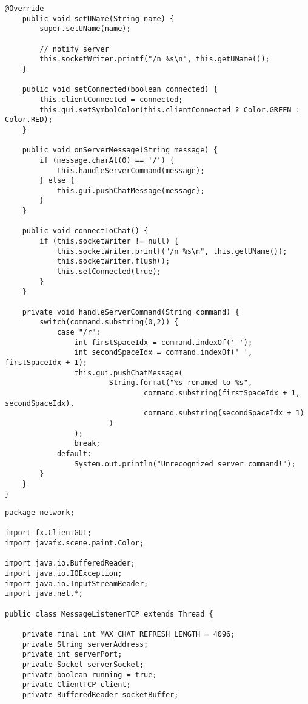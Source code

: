 \begin{enumerate}
\begin{lstlisting}[style=java]
    @Override
    public void setUName(String name) {
        super.setUName(name);

        // notify server
        this.socketWriter.printf("/n %s\n", this.getUName());
    }

    public void setConnected(boolean connected) {
        this.clientConnected = connected;
        this.gui.setSymbolColor(this.clientConnected ? Color.GREEN : Color.RED);
    }

    public void onServerMessage(String message) {
        if (message.charAt(0) == '/') {
            this.handleServerCommand(message);
        } else {
            this.gui.pushChatMessage(message);
        }
    }

    public void connectToChat() {
        if (this.socketWriter != null) {
            this.socketWriter.printf("/n %s\n", this.getUName());
            this.socketWriter.flush();
            this.setConnected(true);
        }
    }

    private void handleServerCommand(String command) {
        switch(command.substring(0,2)) {
            case "/r":
                int firstSpaceIdx = command.indexOf(' ');
                int secondSpaceIdx = command.indexOf(' ', firstSpaceIdx + 1);
                this.gui.pushChatMessage(
                        String.format("%s renamed to %s",
                                command.substring(firstSpaceIdx + 1, secondSpaceIdx),
                                command.substring(secondSpaceIdx + 1)
                        )
                );
                break;
            default:
                System.out.println("Unrecognized server command!");
        }
    }
}

\end{lstlisting}

\begin{lstlisting}[style=java]
package network;

import fx.ClientGUI;
import javafx.scene.paint.Color;

import java.io.BufferedReader;
import java.io.IOException;
import java.io.InputStreamReader;
import java.net.*;

public class MessageListenerTCP extends Thread {

    private final int MAX_CHAT_REFRESH_LENGTH = 4096;
    private String serverAddress;
    private int serverPort;
    private Socket serverSocket;
    private boolean running = true;
    private ClientTCP client;
    private BufferedReader socketBuffer;



\end{lstlisting}
\end{enumerate}
